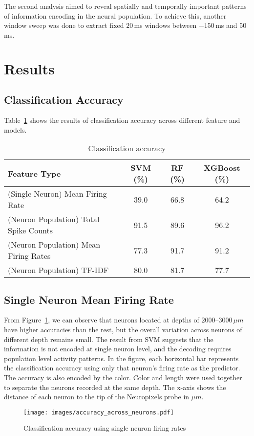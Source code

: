 \documentclass[../CLthesis.tex]{subfiles}
\begin{document}
The second analysis aimed to reveal spatially and temporally important patterns of information encoding in the neural population. To achieve this, another window sweep was done to extract fixed $20$\,ms windows between $-150$\,ms and $50$\,ms.

\section{Results}
\subsection{Classification Accuracy}
Table~\ref{tab:classification_results} shows the results of classification accuracy across different feature and models.
\begin{table}[H]
   \centering
   \begin{tabular}{lccc}
       \toprule
       Feature Type & SVM (\%) & RF (\%) & XGBoost (\%)\\
       \midrule
       (Single Neuron) Mean Firing Rate & 39.0 & 66.8 & 64.2 \\
       (Neuron Population) Total Spike Counts & 91.5 & 89.6 & 96.2 \\
       (Neuron Population) Mean Firing Rates & 77.3 & 91.7 & 91.2 \\
       (Neuron Population) TF-IDF & 80.0 & 81.7 & 77.7 \\
       \bottomrule
   \end{tabular}
   \caption{Classification accuracy}
   \label{tab:classification_results}
\end{table}

\newpage
\subsection{Single Neuron Mean Firing Rate}
From Figure~\ref{fig:single_neuron_results}, we can observe that neurons located at depths of $2000$--$3000\,\mu m$ have higher accuracies than the rest, but the overall variation across neurons of different depth remains small. The result from SVM suggests that the information is not encoded at single neuron level, and the decoding requires population level activity patterns. In the figure, each horizontal bar represents the classification accuracy using only that neuron's firing rate as the predictor. The accuracy is also encoded by the color. Color and length were used together to separate the neurons recorded at the same depth. The x-axis shows the distance of each neuron to the tip of the Neuropixels probe in $\mu m$.
\begin{figure}[H]
  \centering
  \texttt{[image: images/accuracy\_across\_neurons.pdf]}
  \caption{Classification accuracy using single neuron firing rates}
  \label{fig:single_neuron_results}
\end{figure}
\end{document}
